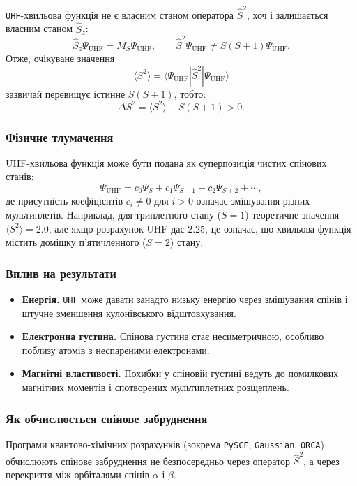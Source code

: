 \texttt{UHF}-хвильова функція не є власним станом оператора $\hat{S}^2$, хоч і залишається власним станом $\hat{S}_z$:
\[
\hat{S}_z \Psi_{\text{UHF}} = M_S \Psi_{\text{UHF}}, \qquad
\hat{S}^2 \Psi_{\text{UHF}} \neq S(S+1)\Psi_{\text{UHF}}.
\]
Отже, очікуване значення
\[
\langle S^2 \rangle = \langle \Psi_{\text{UHF}} | \hat{S}^2 | \Psi_{\text{UHF}} \rangle
\]
зазвичай перевищує істинне $S(S+1)$, тобто:
\[
\Delta S^2 = \langle S^2 \rangle - S(S+1) > 0.
\]

\subsubsection*{Фізичне тлумачення}

UHF-хвильова функція може бути подана як суперпозиція чистих спінових станів:
\[
\Psi_{\text{UHF}} = c_0 \Psi_{S} + c_1 \Psi_{S+1} + c_2 \Psi_{S+2} + \cdots,
\]
де присутність коефіцієнтів $c_i \ne 0$ для $i>0$ означає змішування різних мультиплетів.
Наприклад, для триплетного стану ($S=1$) теоретичне значення $\langle S^2 \rangle = 2.0$, але якщо розрахунок UHF дає $2.25$, це означає, що хвильова функція містить домішку п’ятичленного ($S=2$) стану.

\subsubsection*{Вплив на результати}

\begin{itemize}
    \item \textbf{Енергія.} \texttt{UHF} може давати занадто низьку енергію через змішування спінів і штучне зменшення кулонівського відштовхування.
    \item \textbf{Електронна густина.} Спінова густина стає несиметричною, особливо поблизу атомів з неспареними електронами.
    \item \textbf{Магнітні властивості.} Похибки у спіновій густині ведуть до помилкових магнітних моментів і спотворених мультиплетних розщеплень.
\end{itemize}

\subsubsection{Як обчислюється спінове забруднення}

Програми квантово-хімічних розрахунків (зокрема \texttt{PySCF}, \texttt{Gaussian}, \texttt{ORCA}) обчислюють спінове забруднення не безпосередньо через оператор $\hat{S}^2$, а через перекриття між орбіталями спінів $\alpha$ і $\beta$.

